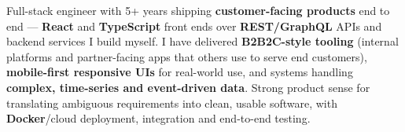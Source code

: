 
\begin{cvparagraph}
Full-stack engineer with 5+ years shipping \textbf{customer-facing products} end to end --- \textbf{React} and \textbf{TypeScript} front ends over \textbf{REST/GraphQL} APIs and backend services I build myself. I have delivered \textbf{B2B2C-style tooling} (internal platforms and partner-facing apps that others use to serve end customers), \textbf{mobile-first responsive UIs} for real-world use, and systems handling \textbf{complex, time-series and event-driven data}. Strong product sense for translating ambiguous requirements into clean, usable software, with \textbf{Docker}/cloud deployment, integration and end-to-end testing.
\end{cvparagraph}
